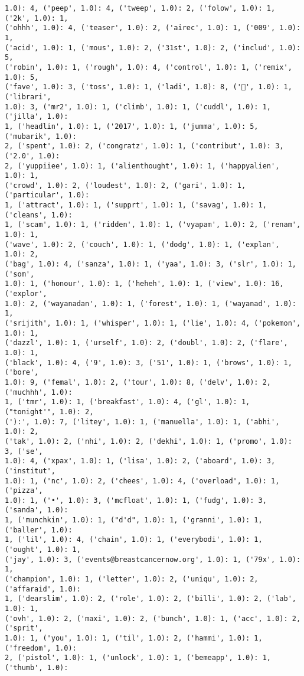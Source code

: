\documentclass[11pt]{article}
\begin{document}
\begin{Verbatim}[commandchars=\\\{\}]
1.0): 4, ('peep', 1.0): 4, ('tweep', 1.0): 2, ('folow', 1.0): 1, ('2k', 1.0): 1,
('ohhh', 1.0): 4, ('teaser', 1.0): 2, ('airec', 1.0): 1, ('009', 1.0): 1,
('acid', 1.0): 1, ('mous', 1.0): 2, ('31st', 1.0): 2, ('includ', 1.0): 5,
('robin', 1.0): 1, ('rough', 1.0): 4, ('control', 1.0): 1, ('remix', 1.0): 5,
('fave', 1.0): 3, ('toss', 1.0): 1, ('ladi', 1.0): 8, ('🐑', 1.0): 1, ('librari',
1.0): 3, ('mr2', 1.0): 1, ('climb', 1.0): 1, ('cuddl', 1.0): 1, ('jilla', 1.0):
1, ('headlin', 1.0): 1, ('2017', 1.0): 1, ('jumma', 1.0): 5, ('mubarik', 1.0):
2, ('spent', 1.0): 2, ('congratz', 1.0): 1, ('contribut', 1.0): 3, ('2.0', 1.0):
2, ('yuppiiee', 1.0): 1, ('alienthought', 1.0): 1, ('happyalien', 1.0): 1,
('crowd', 1.0): 2, ('loudest', 1.0): 2, ('gari', 1.0): 1, ('particular', 1.0):
1, ('attract', 1.0): 1, ('supprt', 1.0): 1, ('savag', 1.0): 1, ('cleans', 1.0):
1, ('scam', 1.0): 1, ('ridden', 1.0): 1, ('vyapam', 1.0): 2, ('renam', 1.0): 1,
('wave', 1.0): 2, ('couch', 1.0): 1, ('dodg', 1.0): 1, ('explan', 1.0): 2,
('bag', 1.0): 4, ('sanza', 1.0): 1, ('yaa', 1.0): 3, ('slr', 1.0): 1, ('som',
1.0): 1, ('honour', 1.0): 1, ('heheh', 1.0): 1, ('view', 1.0): 16, ('explor',
1.0): 2, ('wayanadan', 1.0): 1, ('forest', 1.0): 1, ('wayanad', 1.0): 1,
('srijith', 1.0): 1, ('whisper', 1.0): 1, ('lie', 1.0): 4, ('pokemon', 1.0): 1,
('dazzl', 1.0): 1, ('urself', 1.0): 2, ('doubl', 1.0): 2, ('flare', 1.0): 1,
('black', 1.0): 4, ('9', 1.0): 3, ('51', 1.0): 1, ('brows', 1.0): 1, ('bore',
1.0): 9, ('femal', 1.0): 2, ('tour', 1.0): 8, ('delv', 1.0): 2, ('muchhh', 1.0):
1, ('tmr', 1.0): 1, ('breakfast', 1.0): 4, ('gl', 1.0): 1, ("tonight'", 1.0): 2,
('):', 1.0): 7, ('litey', 1.0): 1, ('manuella', 1.0): 1, ('abhi', 1.0): 2,
('tak', 1.0): 2, ('nhi', 1.0): 2, ('dekhi', 1.0): 1, ('promo', 1.0): 3, ('se',
1.0): 4, ('xpax', 1.0): 1, ('lisa', 1.0): 2, ('aboard', 1.0): 3, ('institut',
1.0): 1, ('nc', 1.0): 2, ('chees', 1.0): 4, ('overload', 1.0): 1, ('pizza',
1.0): 1, ('•', 1.0): 3, ('mcfloat', 1.0): 1, ('fudg', 1.0): 3, ('sanda', 1.0):
1, ('munchkin', 1.0): 1, ("d'd", 1.0): 1, ('granni', 1.0): 1, ('baller', 1.0):
1, ('lil', 1.0): 4, ('chain', 1.0): 1, ('everybodi', 1.0): 1, ('ought', 1.0): 1,
('jay', 1.0): 3, ('events@breastcancernow.org', 1.0): 1, ('79x', 1.0): 1,
('champion', 1.0): 1, ('letter', 1.0): 2, ('uniqu', 1.0): 2, ('affaraid', 1.0):
1, ('dearslim', 1.0): 2, ('role', 1.0): 2, ('billi', 1.0): 2, ('lab', 1.0): 1,
('ovh', 1.0): 2, ('maxi', 1.0): 2, ('bunch', 1.0): 1, ('acc', 1.0): 2, ('sprit',
1.0): 1, ('you', 1.0): 1, ('til', 1.0): 2, ('hammi', 1.0): 1, ('freedom', 1.0):
2, ('pistol', 1.0): 1, ('unlock', 1.0): 1, ('bemeapp', 1.0): 1, ('thumb', 1.0):

\end{Verbatim}
\end{document}
